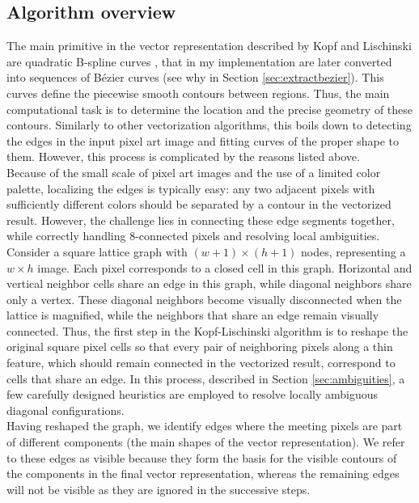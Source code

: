 \documentclass[]{usiinfbachelorproject}
\begin{document}
\subsection{Algorithm overview}
The main primitive in the vector representation described by Kopf and Lischinski are quadratic B-spline curves \cite{Kopf2011}, that in my implementation are later converted into sequences of B\'ezier curves (see why in Section \ref{sec:extractbezier}). This curves define the piecewise smooth contours between regions. Thus, the main computational task is to determine the location and the precise geometry of these contours. Similarly to other vectorization algorithms, this boils down to detecting the edges in the input pixel art image and fitting curves of the proper shape to them. However, this process is complicated by the reasons listed above.\\
Because of the small scale of pixel art images and the use of a limited color palette, localizing the edges is typically easy: any two adjacent pixels with sufficiently different colors should be separated by a contour in the vectorized result. However, the challenge lies in connecting these edge segments together, while correctly handling 8-connected pixels and resolving local ambiguities.\\
Consider a square lattice graph with $(w+1)\times(h+1)$ nodes, representing a $w\times h$ image. Each pixel corresponds to a closed cell in this graph. Horizontal and vertical neighbor cells share an edge in this graph, while diagonal neighbors share only a vertex. These diagonal neighbors become visually disconnected when the lattice is magnified, while the neighbors that share an edge remain visually connected. Thus, the first step in the Kopf-Lischinski algorithm \cite{Kopf2011} is to reshape the original square pixel cells so that every pair of neighboring pixels along a thin feature, which should remain connected in the vectorized result, correspond to cells that share an edge. In this process, described in Section \ref{sec:ambiguities}, a few carefully designed heuristics are employed to resolve locally ambiguous diagonal configurations.\\
Having reshaped the graph, we identify edges where the meeting pixels are part of different components (the main shapes of the vector representation). We refer to these edges as visible because they form the basis for the visible contours of the components in the final vector representation, whereas the remaining edges will not be visible as they are ignored in the successive steps. \\
\end{document}
